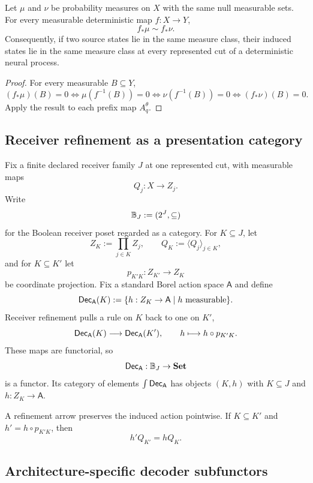 \begin{proposition}
\label{prop:app-measure-class-pushforward}
Let $\mu$ and $\nu$ be probability measures on $X$ with the same null measurable sets. For every measurable deterministic map $f:X\to Y$,
\[
f_*\mu\sim f_*\nu.
\]
Consequently, if two source states lie in the same measure class, their induced states lie in the same measure class at every represented cut of a deterministic neural process.
\end{proposition}

\begin{proof}
For every measurable $B\subseteq Y$,
\[
(f_*\mu)(B)=0
\Longleftrightarrow
\mu(f^{-1}(B))=0
\Longleftrightarrow
\nu(f^{-1}(B))=0
\Longleftrightarrow
(f_*\nu)(B)=0.
\]
Apply the result to each prefix map $A_q^\theta$.
\end{proof}

\subsection{Receiver refinement as a presentation category}

Fix a finite declared receiver family $J$ at one represented cut, with measurable maps
\[
Q_j:X\to Z_j.
\]
Write
\[
\mathbb{B}_J:=(2^J,\subseteq)
\]
for the Boolean receiver poset regarded as a category. For $K\subseteq J$, let
\[
Z_K:=\prod_{j\in K}Z_j,
\qquad
Q_K:=\langle Q_j\rangle_{j\in K},
\]
and for $K\subseteq K'$ let
\[
p_{K'K}:Z_{K'}\to Z_K
\]
be coordinate projection. Fix a standard Borel action space $\mathsf A$ and define
\[
\mathsf{Dec}_{\mathsf A}(K)
:=\{h:Z_K\to\mathsf A\mid h\text{ measurable}\}.
\]
Receiver refinement pulls a rule on $K$ back to one on $K'$,
\begin{equation}
\mathsf{Dec}_{\mathsf A}(K)\longrightarrow\mathsf{Dec}_{\mathsf A}(K'),
\qquad
h\longmapsto h\circ p_{K'K}.
\label{eq:app-decoder-refinement-map}
\end{equation}
These maps are functorial, so
\[
\mathsf{Dec}_{\mathsf A}:\mathbb{B}_J\to\mathbf{Set}
\]
is a functor. Its category of elements $\int\mathsf{Dec}_{\mathsf A}$ has objects $(K,h)$ with $K\subseteq J$ and $h:Z_K\to\mathsf A$.

A refinement arrow preserves the induced action pointwise. If $K\subseteq K'$ and $h'=h\circ p_{K'K}$, then
\begin{equation}
h'Q_{K'}=hQ_K.
\label{eq:app-refinement-preserves-action}
\end{equation}

\subsection{Architecture-specific decoder subfunctors}

